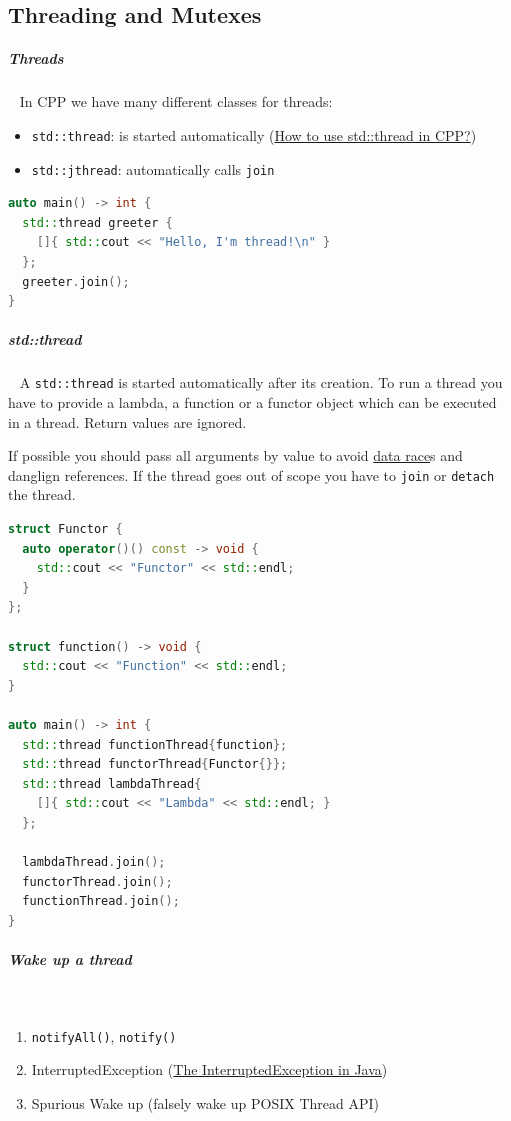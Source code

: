 \documentclass[11pt,twoside,landscape]{article}
\begin{document}
\begin{multicols}{2}
\section{Threading and Mutexes}
\label{sec:orgc31a1f5}
\subparagraph{Threads} \
\label{sec:orgedae7ed}
In CPP we have many different classes for threads:
\begin{itemize}
\item \texttt{std::thread}: is started automatically (\href{../../../roam/20230629112109-how_to_use_std_thread_in_cpp.org}{How to use std::thread in CPP?})
\item \texttt{std::jthread}: automatically calls \texttt{join}
\end{itemize}



\begin{lstlisting}[language=c++,label=lst:org6c63dbb,caption={threads in CPP},captionpos=b,numbers=none]
auto main() -> int {
  std::thread greeter {
    []{ std::cout << "Hello, I'm thread!\n" }
  };
  greeter.join();
}
\end{lstlisting}

\subparagraph{std::thread} \
\label{sec:org4f52ab7}
A \texttt{std::thread} is started automatically after its creation.
To run a thread you have to provide a lambda, a function or a functor object which can be executed in a thread.
Return values are ignored.

If possible you should pass all arguments by value to avoid \href{../../../roam/20220323174221-what_is_a_data_race.org}{data race}s and danglign references.
If the thread goes out of scope you have to \texttt{join} or \texttt{detach} the thread.

\begin{lstlisting}[language=c++,caption={std::thread example},captionpos=b,numbers=none]
struct Functor {
  auto operator()() const -> void {
    std::cout << "Functor" << std::endl;
  }
};

struct function() -> void {
  std::cout << "Function" << std::endl;
}

auto main() -> int {
  std::thread functionThread{function};
  std::thread functorThread{Functor{}};
  std::thread lambdaThread{
    []{ std::cout << "Lambda" << std::endl; }
  };

  lambdaThread.join();
  functorThread.join();
  functionThread.join();
}
\end{lstlisting}

\subparagraph{Wake up a thread} \
\label{sec:org616fc54}
\begin{enumerate}
\item \texttt{notifyAll()}, \texttt{notify()}
\item InterruptedException (\href{../../../roam/20220228135733-the_interruptedexception_in_java.org}{The InterruptedException in Java})
\item Spurious Wake up (falsely wake up POSIX Thread API)
\end{enumerate}


\end{multicols}
\end{document}
